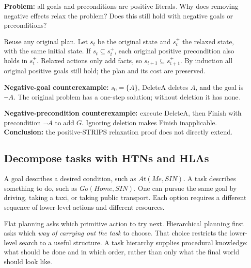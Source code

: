 \documentclass[10pt,a4paper]{article}
\begin{document}
\begin{prf}\label{q:t1p2}
\textbf{Problem:} all goals and preconditions are positive literals. Why does removing negative effects relax the problem? Does this still hold with negative goals or preconditions?

Reuse any original plan. Let $s_t$ be the original state and $s_t^+$ the relaxed state, with the same initial state. If $s_t\subseteq s_t^+$, each original positive precondition also holds in $s_t^+$. Relaxed actions only add facts, so $s_{t+1}\subseteq s_{t+1}^+$. By induction all original positive goals still hold; the plan and its cost are preserved.

\textbf{Negative-goal counterexample:} $s_0=\{A\}$, DeleteA deletes $A$, and the goal is $\neg A$. The original problem has a one-step solution; without deletion it has none.

\textbf{Negative-precondition counterexample:} execute DeleteA, then Finish with precondition $\neg A$ to add $G$. Ignoring deletion makes Finish inapplicable. \textbf{Conclusion:} the positive-STRIPS relaxation proof does not directly extend.
\end{prf}

\subsection{Decompose tasks with HTNs and HLAs}
\begin{idea}
A goal describes a desired condition, such as $At(Me,SIN)$. A task describes something to do, such as $Go(Home,SIN)$. One can pursue the same goal by driving, taking a taxi, or taking public transport. Each option requires a different sequence of lower-level actions and different resources.

Flat planning asks which primitive action to try next. Hierarchical planning first asks which \emph{way of carrying out the task} to choose. That choice restricts the lower-level search to a useful structure. A task hierarchy supplies procedural knowledge: what should be done and in which order, rather than only what the final world should look like.
\end{idea}
\end{document}
